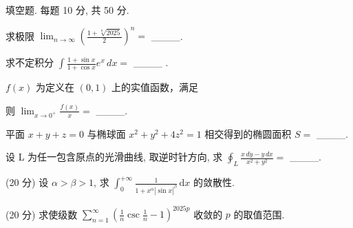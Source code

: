 \par{}
填空题. 每题 10 分, 共 50 分.\par
求极限  $\lim_{n\to\infty}\left(\frac{1+\sqrt[n]{2025}}{2}\right)^n=$  \_\_\_\_.\par
求不定积分  $\int \frac{1 + \sin x}{1 + \cos x} e^{x} \, dx =$ \_\_\_\_ .\par
\par{}
$f(x)$ 为定义在 $(0,1)$ 上的实值函数，满足\par
\nopagebreak[4]
则  $\lim_{x\to0^{+}}\frac{f(x)}{x}=$  \_\_\_\_.\par
平面 $x + y + z = 0$ 与椭球面 $x^{2} + y^{2} + 4z^{2} = 1$ 相交得到的椭圆面积 $S =$ \_\_\_\_.\par
设 L 为任一包含原点的光滑曲线, 取逆时针方向, 求  $\oint_{L}\frac{x\,dy-y\,dx}{x^{2}+y^{2}}=$  \_\_\_\_.\par
\par{}
(20 分) 设 $\alpha > \beta > 1$, 求 $\int_{0}^{+\infty} \frac{1}{1 + x^{\alpha} |\sin x|^{\beta}} \, \mathrm{d}x$ 的敛散性.\par
\par{}
(20 分) 求使级数 $\sum_{n=1}^{\infty} \left( \frac{1}{n} \csc \frac{1}{n} - 1 \right)^{2025p}$ 收敛的 $p$ 的取值范围.\par
